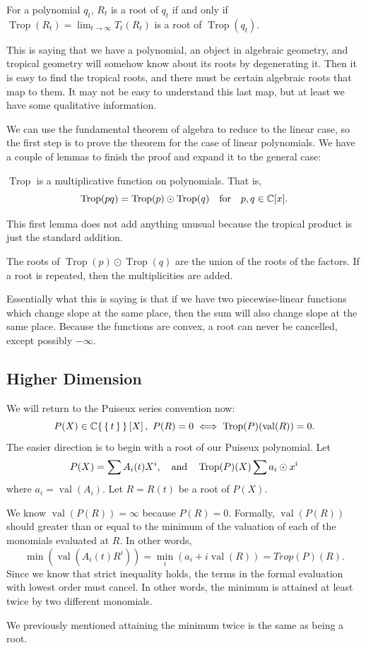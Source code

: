 \documentclass[12pt]{memoir}
\DeclareMathOperator{\val}{val}
\DeclareMathOperator{\Trop}{Trop}
\theoremstyle{definition}
\begin{document}
\begin{Th}[Correspondence]
    For a polynomial $q_t$, $R_t$ is a root of $q_t$ if and only if $\Trop(R_t)=\lim_{t\to\infty}T_t(R_t)$ is a root of $\Trop(q_t)$.
\end{Th}


This is saying that we have a polynomial, an object in algebraic geometry, and tropical geometry will somehow know about its roots by degenerating it. Then it is easy to find the tropical roots, and there must be certain algebraic roots that map to them. It may not be easy to understand this last map, but at least we have some qualitative information.\par 
We can use the fundamental theorem of algebra to reduce to the linear case, so the first step is to prove the theorem for the case of linear polynomials. We have a couple of lemmas to finish the proof and expand it to the general case:


\begin{Lem}
    $\Trop$ is a multiplicative function on polynomials. That is,
    $$\Trop(pq)=\Trop(p)\odot\Trop(q)\word{for}p,q\in\bC[x].$$
    \end{Lem}
    
This first lemma does not add anything unusual because the tropical product is just the standard addition.

    \begin{Lem}
    The roots of $\Trop(p)\odot\Trop(q)$ are the union of the roots of the factors. If a root is repeated, then the multiplicities are added.
    \end{Lem}

    Essentially what this is saying is that if we have two piecewise-linear functions which change slope at the same place, then the sum will also change slope at the same place. Because the functions are convex, a root can never be cancelled, except possibly $-\infty$.

    \subsection{Higher Dimension}

    We will return to the Puiseux series convention now:
    $$P(X)\in\bC\set{\set{t}}\bonj{X},\ P(R)=0\iff \Trop(P)(\val(R))=0.$$
    The easier direction is to begin with a root of our Puiseux polynomial. Let 
    $$P(X)=\sum A_i(t)X^i,\word{and}\Trop(P)(X)\sum a_i\odot x^i$$
    where $a_i=\val(A_i)$. Let $R=R(t)$ be a root of $P(X)$.\par 
    We know $\val(P(R))=\infty$ because $P(R)=0$. Formally, $\val(P(R))$ should greater than or equal to the minimum of the valuation of each of the monomials evaluated at $R$. In other words,
    $$\min(\val(A_i(t)R^i))=\min_i(a_i+i\val(R))=Trop(P)(R).$$
    Since we know that strict inequality holds, the terms in the formal evaluation with lowest order must cancel. In other words, the minimum is attained at least twice by two different monomials.\par 
    We previously mentioned attaining the minimum twice is the same as being a root.
\end{document}
